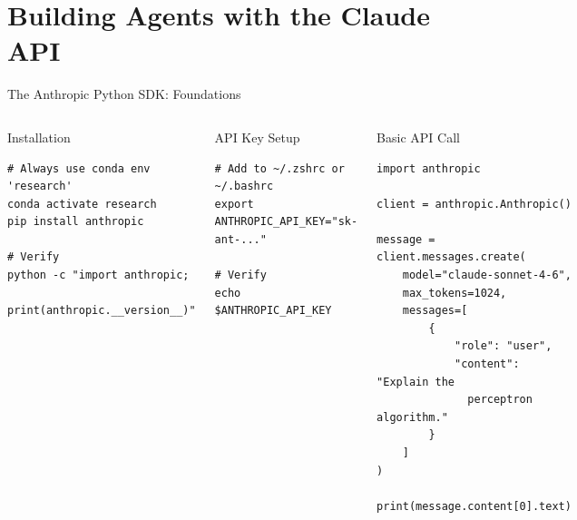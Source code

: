 \documentclass[aspectratio=169,xcolor=dvipsnames]{beamer}
\begin{document}
\section{Building Agents with the Claude API}

\begin{frame}[fragile]{The Anthropic Python SDK: Foundations}
    \begin{columns}
        \begin{block}{Installation}
                        \begin{lstlisting}[style=BashStyle]
# Always use conda env 'research'
conda activate research
pip install anthropic

# Verify
python -c "import anthropic;
           print(anthropic.__version__)"
            \end{lstlisting}
        \end{block}
        \begin{block}{API Key Setup}
                        \begin{lstlisting}[style=BashStyle]
# Add to ~/.zshrc or ~/.bashrc
export ANTHROPIC_API_KEY="sk-ant-..."

# Verify
echo $ANTHROPIC_API_KEY
            \end{lstlisting}
        \end{block}

        \begin{exampleblock}{Basic API Call}
                        \begin{lstlisting}[style=PythonStyle]
import anthropic

client = anthropic.Anthropic()

message = client.messages.create(
    model="claude-sonnet-4-6",
    max_tokens=1024,
    messages=[
        {
            "role": "user",
            "content": "Explain the
              perceptron algorithm."
        }
    ]
)

print(message.content[0].text)
            \end{lstlisting}
        \end{exampleblock}
    \end{columns}
\end{frame}
\end{document}
